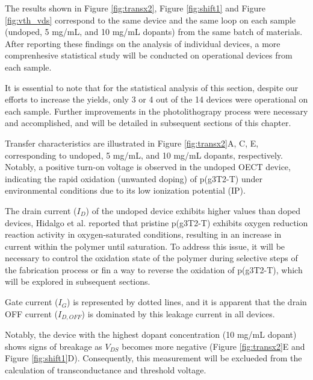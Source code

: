 The results shown in Figure \ref{fig:transx2}, Figure \ref{fig:shift1} and Figure \ref{fig:vth_vds} correspond to the same device and the same loop on each sample (undoped, 5 mg/mL, and 10 mg/mL dopants) from the same batch of materials. After reporting these findings on the analysis of individual devices, a more comprenhesive statistical study will be conducted on operational devices from each sample. 

It is essential to note that for the statistical analysis of this section, despite our efforts to increase the yields, only 3 or 4 out of the 14 devices were operational on each sample. Further improvements in the photolithograpy process were necessary and accomplished, and will be detailed in subsequent sections of this chapter. 

Transfer characteristics are illustrated in Figure \ref{fig:transx2}A, C, E, corresponding to undoped, 5 mg/mL, and 10 mg/mL dopants, respectively. Notably, a positive turn-on voltage is observed in the undoped OECT device, indicating the rapid oxidation (unwanted doping) of p(g3T2-T) under environmental conditions due to its low ionization potential (IP). 

The drain current ($I_{D}$) of the undoped device exhibits higher values than doped devices, Hidalgo et al.  \cite{hidalgocastilloSimultaneousPerformanceStability2022a} reported that pristine p(g3T2-T) exhibits oxygen reduction reaction activity in oxygen-saturated conditions, resulting in an increase in current within the polymer until saturation. To address this issue, it will be necessary to control the oxidation state of the polymer during selective steps of the fabrication process or fin a way to reverse the oxidation of p(g3T2-T), which will be explored in subsequent sections.

Gate current ($I_{G}$) is represented by dotted lines, and it is apparent that the drain OFF current ($I_{D,OFF}$) is dominated by this leakage current in all devices. %

Notably, the device with the highest dopant concentration (10 mg/mL dopant) shows signs of breakage as $V_{DS}$ becomes more negative (Figure \ref{fig:transx2}E and Figure \ref{fig:shift1}D). Consequently, this measurement will be exclueded from the calculation of transconductance and threshold voltage.

